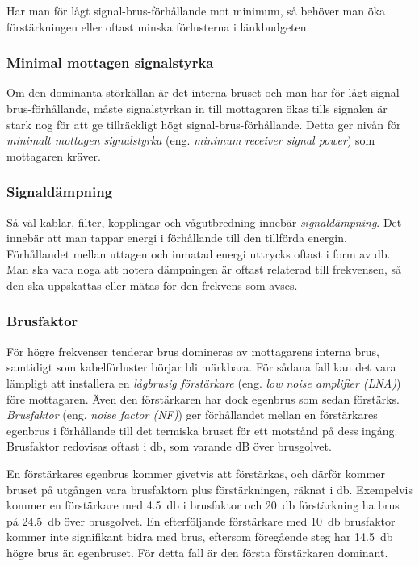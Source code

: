 Har man för lågt signal-brus-förhållande mot minimum, så behöver man öka
förstärkningen eller oftast minska förlusterna i länkbudgeten.

\subsubsection{Minimal mottagen signalstyrka}

Om den dominanta störkällan är det interna bruset och man har för lågt
signal-brus-förhållande, måste signalstyrkan in till mottagaren ökas
tills signalen är stark nog för att ge tillräckligt högt
signal-brus-förhållande.
Detta ger nivån för \emph{minimalt mottagen signalstyrka} (eng.
\emph{minimum receiver signal power}) som mottagaren kräver.

\subsubsection{Signaldämpning}

Så väl kablar, filter, kopplingar och vågutbredning innebär
\emph{signaldämpning}.
Det innebär att man tappar energi i förhållande till den tillförda energin.
Förhållandet mellan uttagen och inmatad energi uttrycks oftast i form av
\si{\decibel}.
Man ska vara noga att notera dämpningen är oftast relaterad till frekvensen,
så den ska uppskattas eller mätas för den frekvens som avses.

\subsubsection{Brusfaktor}
\label{brusfaktor}

För högre frekvenser tenderar brus domineras av mottagarens interna brus,
samtidigt som kabelförluster börjar bli märkbara.
För sådana fall kan det vara lämpligt att installera en
\emph{lågbrusig förstärkare} (eng. \emph{low noise amplifier (LNA)}) före
mottagaren.
Även den förstärkaren har dock egenbrus som sedan förstärks.
\emph{Brusfaktor} (eng. \emph{noise factor (NF)}) ger förhållandet mellan en
förstärkares egenbrus i förhållande till det termiska bruset för ett motstånd
på dess ingång.
Brusfaktor redovisas oftast i \si{\decibel}, som varande dB över brusgolvet.

En förstärkares egenbrus kommer givetvis att förstärkas, och därför kommer
bruset på utgången vara brusfaktorn plus förstärkningen, räknat i \si{\decibel}.
Exempelvis kommer en förstärkare med \SI{4,5}{\decibel} i brusfaktor och
\SI{20}{\decibel} förstärkning ha brus på \SI{24,5}{\decibel} över brusgolvet.
En efterföljande förstärkare med \SI{10}{\decibel} brusfaktor kommer inte
signifikant bidra med brus, eftersom föregående steg har \SI{14,5}{\decibel}
högre brus än egenbruset.
För detta fall är den första förstärkaren dominant.

